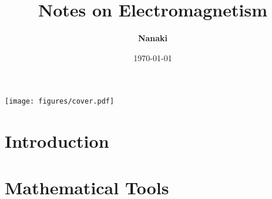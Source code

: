 \documentclass[
    ebook,
    11pt,
    twoside,
    onecolumn,
    openright,
    draft
]{memoir}
\begin{document}
\begin{titlingpage}
    \title{\HUGE\textbf{Notes on Electromagnetism}}
    \author{\Large\textbf{Nanaki}}
    \date{\Large{\today}}

    \maketitle
    \texttt{[image: figures/cover.pdf]}
\end{titlingpage}

\frontmatter

\tableofcontents

\mainmatter

\chapter{Introduction}

\appendix

\chapter{Mathematical Tools}

\backmatter
\end{document}
